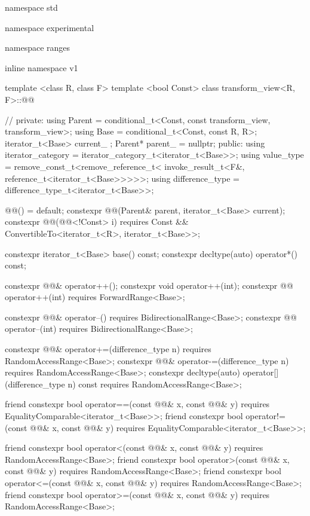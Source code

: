 \begin{codeblock}
namespace std { namespace experimental { namespace ranges { inline namespace v1 {
  template <class R, class F>
  template <bool Const>
  class transform_view<R, F>::@@ { // \expos
  private:
    using Parent = conditional_t<Const, const transform_view, transform_view>;
    using Base = conditional_t<Const, const R, R>;
    iterator_t<Base> current_ {};
    Parent* parent_ = nullptr;
  public:
    using iterator_category = iterator_category_t<iterator_t<Base>>;
    using value_type = remove_const_t<remove_reference_t<
        invoke_result_t<F&, reference_t<iterator_t<Base>>>>>;
    using difference_type = difference_type_t<iterator_t<Base>>;

    @@() = default;
    constexpr @@(Parent& parent, iterator_t<Base> current);
    constexpr @@(@@<!Const> i)
      requires Const && ConvertibleTo<iterator_t<R>, iterator_t<Base>>;

    constexpr iterator_t<Base> base() const;
    constexpr decltype(auto) operator*() const;

    constexpr @@& operator++();
    constexpr void operator++(int);
    constexpr @@ operator++(int) requires ForwardRange<Base>;

    constexpr @@& operator--() requires BidirectionalRange<Base>;
    constexpr @@ operator--(int) requires BidirectionalRange<Base>;

    constexpr @@& operator+=(difference_type n)
      requires RandomAccessRange<Base>;
    constexpr @@& operator-=(difference_type n)
      requires RandomAccessRange<Base>;
    constexpr decltype(auto) operator[](difference_type n) const
      requires RandomAccessRange<Base>;

    friend constexpr bool operator==(const @@& x, const @@& y)
      requires EqualityComparable<iterator_t<Base>>;
    friend constexpr bool operator!=(const @@& x, const @@& y)
      requires EqualityComparable<iterator_t<Base>>;

    friend constexpr bool operator<(const @@& x, const @@& y)
      requires RandomAccessRange<Base>;
    friend constexpr bool operator>(const @@& x, const @@& y)
      requires RandomAccessRange<Base>;
    friend constexpr bool operator<=(const @@& x, const @@& y)
      requires RandomAccessRange<Base>;
    friend constexpr bool operator>=(const @@& x, const @@& y)
      requires RandomAccessRange<Base>;

}}}}}
\end{codeblock}

